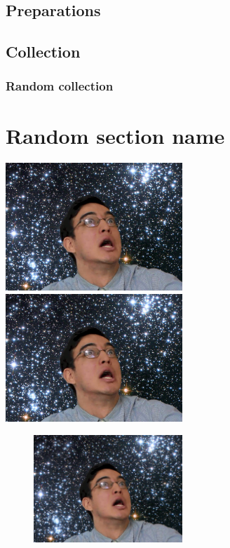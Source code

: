 \documentclass{article}
\begin{document}
\subsection{Preparations}

\subsection{Collection}

\subsubsection{Random collection}

\section{Random section name}
\includegraphics[width=0.5\textwidth]{frank}
\includegraphics[width=0.5\textwidth,angle = 180]{frank}
\begin{figure}[htbp]%

\includegraphics[width=0.5\textwidth]{frank}
\end{figure}
\end{document}
